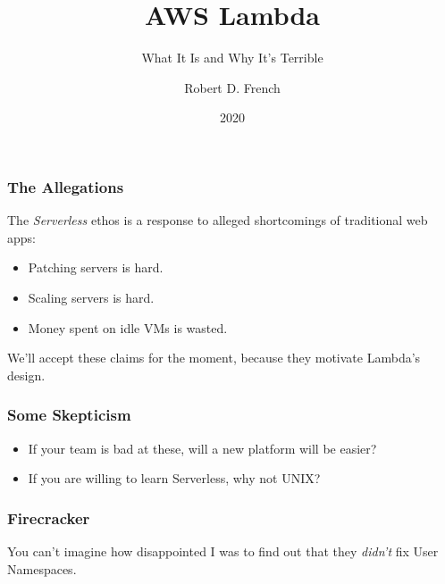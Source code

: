 \documentclass{beamer}
\title{AWS Lambda}
\subtitle{What It Is and Why It's Terrible}
\author{Robert D. French}
\institute{Old Man Yells at Cloud, Inc.}
\date{2020}
\begin{document}
\frame{\titlepage}

\begin{frame}
	\frametitle{The Allegations}
	The \emph{Serverless} ethos is a response to alleged shortcomings of traditional
	web apps:
	\begin{itemize}
		\pause \item Patching servers is hard.
		\pause \item Scaling servers is hard.
		\pause \item Money spent on idle VMs is wasted.
	\end{itemize}
	\pause
	We'll accept these claims for the moment, because they motivate Lambda's design.
\end{frame}

\begin{frame}
	\frametitle{Some Skepticism}
	\begin{itemize}
		\item If your team is bad at these, will a new platform will be easier?
		\pause \item If you are willing to learn Serverless, why not UNIX?
	\end{itemize}
\end{frame}
 
\begin{frame}
	\frametitle{Firecracker}
	You can't imagine how disappointed I was to find out that they \emph{didn't} fix
	User Namespaces.
\end{frame}
 
\end{document}
